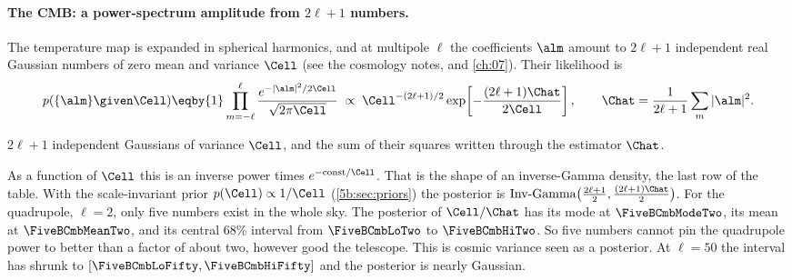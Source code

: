 \paragraph{The CMB: a power-spectrum amplitude from $2\ell+1$ numbers.}
The temperature map is expanded in spherical harmonics, and at multipole $\ell$ the
coefficients $\alm$ amount to $2\ell+1$ independent real Gaussian numbers of zero mean
and variance $\Cell$ (see the cosmology notes, and \cref{ch:07}). Their likelihood is
\begin{align*}
  p(\{\alm\}\given\Cell)
  \eqby{1}\prod_{m=-\ell}^{\ell}\frac{e^{-|\alm|^2/2\Cell}}{\sqrt{2\pi\Cell}}
  \;\propto\;\Cell^{-(2\ell+1)/2}\exp\!\left[-\frac{(2\ell+1)\Chat}{2\Cell}\right],
  \qquad \Chat=\frac{1}{2\ell+1}\sum_m|\alm|^2 .
\end{align*}
\begin{explain}
  \item $2\ell+1$ independent Gaussians of variance $\Cell$, and the sum of their squares
        written through the estimator $\Chat$.
\end{explain}
As a function of $\Cell$ this is an inverse power times $e^{-\text{const}/\Cell}$. That
is the shape of an inverse-Gamma density, the last row of the table. With the scale-invariant prior
$p(\Cell)\propto1/\Cell$ (\cref{5b:sec:priors}) the posterior is
$\text{Inv-Gamma}\bigl(\tfrac{2\ell+1}2,\tfrac{(2\ell+1)\Chat}2\bigr)$. For the
quadrupole, $\ell=2$, only five numbers exist in the whole sky. The posterior of
$\Cell/\Chat$ has its mode at $\FiveBCmbModeTwo$, its mean at $\FiveBCmbMeanTwo$, and its
central 68\% interval from $\FiveBCmbLoTwo$ to $\FiveBCmbHiTwo$. So five numbers cannot
pin the quadrupole power to better than a factor of about two, however good the
telescope. This is cosmic variance seen as a posterior. At $\ell=50$ the interval has shrunk to
$[\FiveBCmbLoFifty,\FiveBCmbHiFifty]$ and the posterior is nearly Gaussian.

